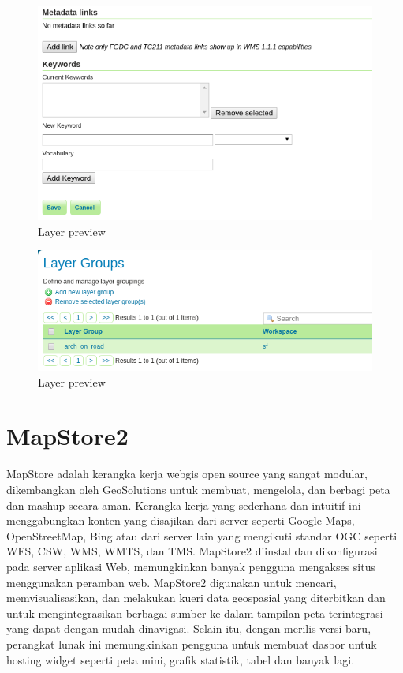 \documentclass[]{book}
\begin{document}
\begin{figure}

{\centering \includegraphics[width=0.6\linewidth]{images/08/gs25} 

}

\caption{Layer preview}\label{fig:gs25}
\end{figure}

\begin{figure}

{\centering \includegraphics[width=0.6\linewidth]{images/08/gs26} 

}

\caption{Layer preview}\label{fig:gs26}
\end{figure}

\hypertarget{hari_kedelapan}{%
\chapter{MapStore2}\label{hari_kedelapan}}

MapStore adalah kerangka kerja webgis open source yang sangat modular, dikembangkan oleh GeoSolutions untuk membuat, mengelola, dan berbagi peta dan mashup secara aman. Kerangka kerja yang sederhana dan intuitif ini menggabungkan konten yang disajikan dari server seperti Google Maps, OpenStreetMap, Bing atau dari server lain yang mengikuti standar OGC seperti WFS, CSW, WMS, WMTS, dan TMS. MapStore2 diinstal dan dikonfigurasi pada server aplikasi Web, memungkinkan banyak pengguna mengakses situs menggunakan peramban web. MapStore2 digunakan untuk mencari, memvisualisasikan, dan melakukan kueri data geospasial yang diterbitkan dan untuk mengintegrasikan berbagai sumber ke dalam tampilan peta terintegrasi yang dapat dengan mudah dinavigasi. Selain itu, dengan merilis versi baru, perangkat lunak ini memungkinkan pengguna untuk membuat dasbor untuk hosting widget seperti peta mini, grafik statistik, tabel dan banyak lagi.
\end{document}
